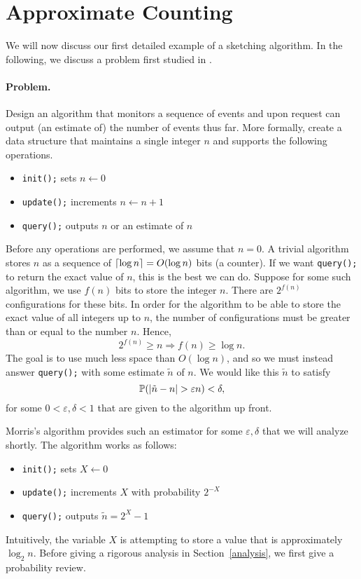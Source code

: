 \documentclass[11pt]{article}
\newcommand{\eps}{\varepsilon}
\DeclarePairedDelimiter\ceil{\lceil}{\rceil}
\DeclarePairedDelimiter\abs{\lvert}{\rvert}
\begin{document}
\section{Approximate Counting}

We will now discuss our first detailed example of a sketching algorithm. In the following, we discuss a problem first studied in \cite{Morris78}.

\paragraph{Problem.} Design an algorithm that monitors a sequence of events and upon request can output (an estimate of) the number of events thus far. More formally, create a data structure that maintains a single integer $n$ and supports the following operations.
\begin{itemize}[noitemsep]
    \item \verb|init();| sets $n \leftarrow 0$
    \item \verb|update();| increments $n \leftarrow n + 1$
    \item \verb|query();| outputs $n$ or an estimate of $n$
\end{itemize}
Before any operations are performed, we assume that $n = 0$. A trivial algorithm stores $n$ as a sequence of $\ceil{\log{n}} = O(\log{n})$ bits (a counter). If we want \verb|query();| to return the exact value of $n$, this is the best we can do. Suppose for some such algorithm, we use $f(n)$ bits to store the integer $n$. There are $2^{f(n)}$ configurations for these bits. In order for the algorithm to be able to store the exact value of all integers up to $n$, the number of configurations must be greater than or equal to the number $n$. Hence,
\[
    2^{f(n)} \geq n \Rightarrow f(n) \geq \log{n}.
\]
The goal is to use much less space than $O(\log{n})$, and so we must instead answer \verb|query();| with some estimate $\tilde{n}$ of $n$. We would like this $\tilde{n}$ to satisfy
\begin{equation} 
    \mathbb{P}(\abs{\tilde{n} - n} > \eps{}n) < \delta, \label{eqn:epsdelta}
\end{equation} 
for some $0 < \eps,\delta < 1$ that are given to the algorithm up front.

Morris's algorithm provides such an estimator for some $\eps,\delta$ that we will analyze shortly. The algorithm works as follows:
\begin{itemize}[noitemsep]
    \item \verb|init();| sets $X \leftarrow 0$
    \item \verb|update();| increments $X$ with probability $2^{-X}$
    \item \verb|query();| outputs $\tilde{n} = 2^X - 1$
\end{itemize}
Intuitively, the variable $X$ is attempting to store a value that is approximately $\log_2{n}$. Before giving a rigorous analysis in Section~\ref{analysis}, we first give a probability review. 
\end{document}
